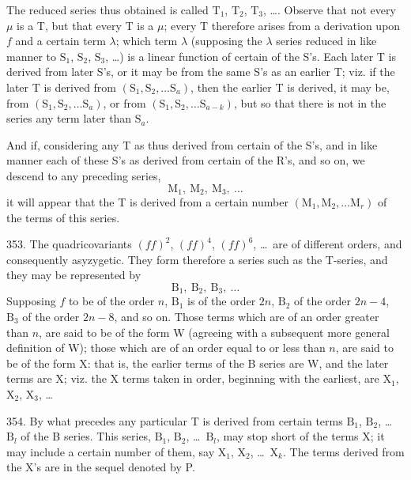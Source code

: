 \documentclass[11pt,a4paper]{article}
\begin{document}
The reduced series thus obtained is called $\mathrm{T}_{1}$, $\mathrm{T}_{2}$, $\mathrm{T}_{3}$, \ldots. Observe that not every $\mu$ is a T, but that every T is a $\mu$; every T therefore arises from a derivation upon $f$ and a certain term $\lambda$; which term $\lambda$ (supposing the $\lambda$ series reduced in like manner to $\mathrm{S}_{1}$, $\mathrm{S}_{2}$, $\mathrm{S}_{3}$, \ldots) is a linear function of certain of the S's. Each later T is derived from later S's, or it may be from the same S's as an earlier T; viz. if the later T is derived from $(\mathrm{S}_{1}, \mathrm{S}_{2}, \ldots \mathrm{S}_{a})$, then the earlier T is derived, it may be, from $(\mathrm{S}_{1}, \mathrm{S}_{2}, \ldots \mathrm{S}_{a})$, or from $(\mathrm{S}_{1}, \mathrm{S}_{2}, \ldots \mathrm{S}_{a-k})$, but so that there is not in the series any term later than $\mathrm{S}_{a}$.

\newpage
\setcounter{page}{350}

And if, considering any T as thus derived from certain of the S's, and in like manner each of these S's as derived from certain of the R's, and so on, we descend to any preceding series,
\[
\mathrm{M}_{1},\ \mathrm{M}_{2},\ \mathrm{M}_{3},\ \ldots
\]
it will appear that the T is derived from a certain number $(\mathrm{M}_{1}, \mathrm{M}_{2}, \ldots \mathrm{M}_{r})$ of the terms of this series.

353. The quadricovariants $(ff)^{2}$, $(ff)^{4}$, $(ff)^{6}$, \ldots\ are of different orders, and consequently asyzygetic. They form therefore a series such as the T-series, and they may be represented by
\[
\mathrm{B}_{1},\ \mathrm{B}_{2},\ \mathrm{B}_{3},\ \ldots
\]
Supposing $f$ to be of the order $n$, $\mathrm{B}_{1}$ is of the order $2n$, $\mathrm{B}_{2}$ of the order $2n-4$, $\mathrm{B}_{3}$ of the order $2n-8$, and so on. Those terms which are of an order greater than $n$, are said to be of the form W (agreeing with a subsequent more general definition of W); those which are of an order equal to or less than $n$, are said to be of the form X: that is, the earlier terms of the B series are W, and the later terms are X; viz. the X terms taken in order, beginning with the earliest, are $\mathrm{X}_{1}$, $\mathrm{X}_{2}$, $\mathrm{X}_{3}$, \ldots

354. By what precedes any particular T is derived from certain terms $\mathrm{B}_{1}$, $\mathrm{B}_{2}$, \ldots\ $\mathrm{B}_{l}$ of the B series. This series, $\mathrm{B}_{1}$, $\mathrm{B}_{2}$, \ldots\ $\mathrm{B}_{l}$, may stop short of the terms X; it may include a certain number of them, say $\mathrm{X}_{1}$, $\mathrm{X}_{2}$, \ldots\ $\mathrm{X}_{k}$. The terms derived from the X's are in the sequel denoted by P.
\end{document}
